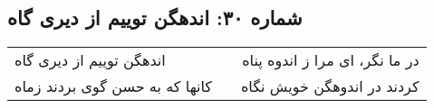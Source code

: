 \begin{center}
\section*{شماره ۳۰: اندهگن توییم از دیری گاه}
\label{sec:030}
\begin{longtable}{l p{0.5cm} r}
اندهگن توییم از دیری گاه
&&
در ما نگر، ای مرا ز اندوه پناه
\\
کانها که به حسن گوی بردند زماه
&&
کردند در اندوهگن خویش نگاه
\\
\end{longtable}
\end{center}
